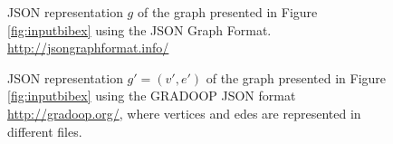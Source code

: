 \begin{figure}[!p]
\centering

\caption{JSON representation $g$ of the graph presented in Figure \ref{fig:inputbibex} using the JSON Graph Format. {\url{http://jsongraphformat.info/}}}
\label{fig:jsongraphformat}
\end{figure}


\begin{figure}[!hpt]
\centering
\begin{minipage}[!t]{0.8\textwidth}
\centering

\label{fig:gravertex}
\end{minipage}
\begin{minipage}[!t]{0.7\textwidth}
\centering

\label{fig:graedge}
\end{minipage}
\caption{JSON representation $g'=(v',e')$ of the graph presented in Figure \ref{fig:inputbibex} using the GRADOOP JSON format  {\url{http://gradoop.org/}}, where vertices and edes are represented in different files.}
\label{fig:JSONGradoop}
\end{figure}

